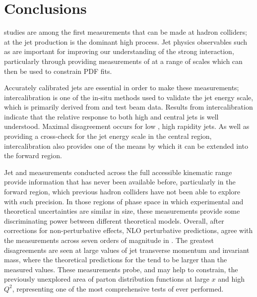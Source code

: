 \chapter{Conclusions}
\label{chap:conclusions}


\QCD studies are among the first measurements that can be made at hadron colliders;
at the \LHC jet production is the dominant high \pT process. Jet physics observables
such as  are important for improving our understanding of the strong interaction,
particularly through providing measurements of \alphaS at a range of scales which
can then be used to constrain PDF fits.

Accurately calibrated jets are essential in order to make these measurements; \dijet
intercalibration is one of the in-situ methods used to validate the jet energy scale,
which is primarily derived from \MC and test beam data. Results from intercalibration
indicate that the relative response to both high \pT and central jets is well understood.
Maximal disagreement occurs for low \pT, high rapidity jets. As well as providing a cross-check for the jet energy scale
in the central region, intercalibration also provides one of the means by which
it can be extended into the forward region.

Jet and \dijet \xs measurements conducted across the full accessible kinematic range
provide information that has never been available before, particularly in the forward
region, which previous hadron colliders have not been able to explore with such
precision. In those regions of phase space in which experimental and theoretical
uncertainties are similar in size, these measurements provide some discriminating
power between different theoretical models. Overall, after corrections for non-perturbative effects, NLO perturbative \QCD predictions,
agree with the measurements across seven orders of magnitude in \xs. The greatest
disagreements are seen at large values of jet transverse momentum and \dijet invariant
mass, where the theoretical predictions for the  tend to be larger than the
measured values. These measurements probe, and may help to constrain, the previously unexplored area of parton distribution
functions at large $x$ and high $Q^2$, representing one of the most comprehensive
tests of \QCD ever performed.

